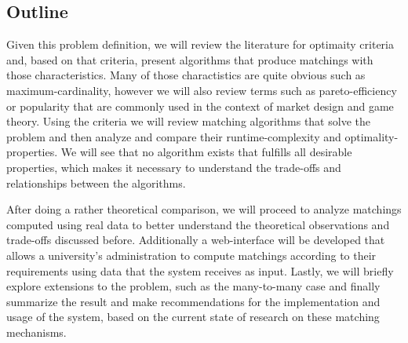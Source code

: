 \subsection{Outline}
Given this problem definition, we will review the literature for optimaity criteria and, based on that criteria, present algorithms that produce matchings with those characteristics. Many of those charactistics are quite obvious such as maximum-cardinality, however we will also review terms such as pareto-efficiency or popularity that are commonly used in the context of market design and game theory. 
Using the criteria we will review matching algorithms that solve the problem and then analyze and compare their runtime-complexity and optimality-properties. We will see that no algorithm exists that fulfills all desirable properties, which makes it necessary to understand the trade-offs and relationships between the algorithms. 

After doing a rather theoretical comparison, we will proceed to analyze matchings computed using real data to better understand the theoretical observations and trade-offs discussed before. Additionally a web-interface will be developed that allows a university's administration to compute matchings according to their requirements using data that the system receives as input. Lastly, we will briefly explore extensions to the problem, such as the many-to-many case and finally summarize the result and make recommendations for the implementation and usage of the system, based on the current state of research on these matching mechanisms.